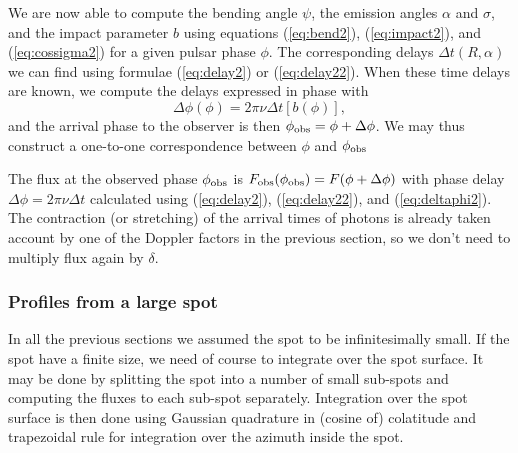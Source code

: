 \documentclass{wihuri}
\def\be{\begin{equation}}
\def\ee{\end{equation}}
\def\phiobs{\phi_{\rm obs}}
\begin{document}
We are now able to compute the bending angle $\psi$, the emission angles $\alpha$ and $\sigma$, and the impact parameter $b$ using equations (\ref{eq:bend2}), (\ref{eq:impact2}), and (\ref{eq:cossigma2}) for a given pulsar phase $\phi$. The corresponding delays $\Delta t(R,\alpha)$   we can find using formulae (\ref{eq:delay2}) or (\ref{eq:delay22}). When these time delays are known, we compute the delays expressed in phase with 
\be \label{eq:deltaphi2}
\Delta \phi(\phi) =2\pi\nu \Delta t[b(\phi)],
\ee
and the arrival phase to the observer is then $\phiobs=\phi+ \Delta\phi$. We may thus construct a one-to-one correspondence between $\phi$ and $\phiobs$

The flux at the observed phase $\phiobs$ is
${F}_{\rm obs}(\phiobs)=F(\phi+\Delta\phi)$ with
phase delay  $\Delta \phi=2\pi\nu\Delta t$
calculated using (\ref{eq:delay2}), (\ref{eq:delay22}), and (\ref{eq:deltaphi2}).
The contraction (or stretching) of the arrival times of photons is already taken account by one of the Doppler factors in the previous section, so we don't need to multiply flux again by $\delta$. 




\subsubsection{Profiles from a large spot} 

In all the previous sections we assumed the spot to be infinitesimally small. If the spot have a finite size, we need of course to integrate over the spot surface. It may be done by splitting the spot into a number of small sub-spots and computing the fluxes to each sub-spot separately. Integration over the spot surface is then done using Gaussian quadrature in (cosine of) colatitude and trapezoidal rule for integration over the azimuth inside the spot. 
\end{document}
